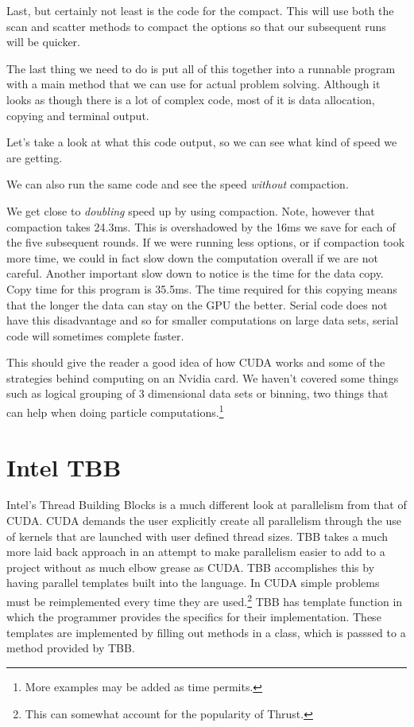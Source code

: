 \documentclass{article}
\newcommand{\comp}[1]{{\ttfamily #1}}
\begin{document}
  Last, but certainly not least is the code for the compact. This will use both the scan and scatter methods to compact the options so that our subsequent runs will be quicker.

  

  The last thing we need to do is put all of this together into a runnable program with a \comp{main} method that we can use for actual problem solving. Although it looks as though there is a lot of complex code, most of it is data allocation, copying and terminal output.

  

  Let's take a look at what this code output, so we can see what kind of speed we are getting.

  

	We can also run the same code and see the speed \emph{without} compaction.

  

  We get close to \emph{doubling} speed up by using compaction. Note, however that compaction takes 24.3ms. This is overshadowed by the 16ms we save for each of the five subsequent rounds. If we were running less options, or if compaction took more time, we could in fact slow down the computation overall if we are not careful. Another important slow down to notice is the time for the data copy. Copy time for this program is 35.5ms. The time required for this copying means that the longer the data can stay on the GPU the better. Serial code does not have this disadvantage and so for smaller computations on large data sets, serial code will sometimes complete faster.

  This should give the reader a good idea of how CUDA works and some of the strategies behind computing on an Nvidia card. We haven't covered some things such as logical grouping of 3 dimensional data sets or binning, two things that can help when doing particle computations.\footnote{More examples may be added as time permits.}

\part{Intel TBB}
Intel's Thread Building Blocks is a much different look at parallelism from that of CUDA. CUDA demands the user explicitly create all parallelism through the use of kernels that are launched with user defined thread sizes. TBB takes a much more laid back approach in an attempt to make parallelism easier to add to a project without as much elbow grease as CUDA. TBB accomplishes this by having parallel templates built into the language. In CUDA simple problems must be reimplemented every time they are used.\footnote{This can somewhat account for the popularity of Thrust.} TBB has template function in which the programmer provides the specifics for their implementation. These templates are implemented by filling out methods in a class, which is passsed to a method provided by TBB. 
\end{document}
